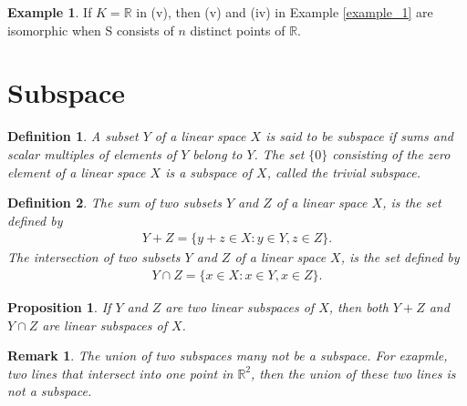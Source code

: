 \documentclass[10pt]{book}
\newtheorem{definition}{Definition}[chapter]
\newtheorem{proposition}{Proposition}[chapter]
\newtheorem{remark}{Remark}[chapter]
\theoremstyle{definition}
\newtheorem{example}{Example}[chapter]
\numberwithin{equation}{chapter}
\begin{document}
\medskip

\begin{example}
If $K=\mathbb{R}$ in (v), then (v) and (iv) in Example \ref{example_1} are isomorphic when S
consists of $n$ distinct points of $\mathbb{R}$.
\end{example}

\medskip

\section{Subspace}
\begin{definition}
A subset $Y$ of a linear space $X$ is said to be subspace if sums and scalar multiples of elements of $Y$ belong to $Y$. The set $\{0\}$ consisting of the zero element of a linear space $X$ is a subspace of $X$, called the trivial subspace.
\end{definition}

\medskip

\begin{definition}
The sum of two subsets $Y$ and $Z$ of a linear space $X$, is the set defined by 
\begin{align*}
    Y+Z = \{y+z\in X: y\in Y, z\in Z\}.
\end{align*}
The intersection of two subsets $Y$ and $Z$ of a linear space $X$, is the set defined by
\begin{align*}
    Y\cap Z = \{x\in X: x\in Y, x\in Z\}.
\end{align*}
\end{definition}

\medskip

\begin{proposition}
If $Y$ and $Z$ are two linear subspaces of $X$, then both $Y+Z$ and $Y\cap Z$ are linear subspaces of $X$.
\end{proposition}
\begin{remark}
The union of two subspaces many not be a subspace. For exapmle, two lines that intersect into one point in $\mathbb{R}^2$, then the union of these two lines is not a subspace.
\end{remark}

\medskip
\end{document}
